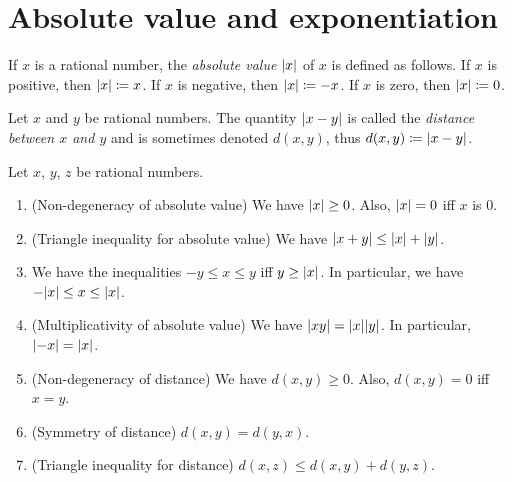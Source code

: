 \section{Absolute value and exponentiation}\label{sec:4.3}

\begin{defn}\label{4.3.1}
  If \(x\) is a rational number, the \emph{absolute value} \(\left\lvert x\right\rvert\) of \(x\) is defined as follows.
  If \(x\) is positive, then \(\left\lvert x\right\rvert \coloneqq x\).
  If \(x\) is negative, then \(\left\lvert x\right\rvert \coloneqq -x\).
  If \(x\) is zero, then \(\left\lvert x\right\rvert \coloneqq 0\).
\end{defn}

\begin{defn}[Distance]\label{4.3.2}
  Let \(x\) and \(y\) be rational numbers.
  The quantity \(\left\lvert x - y\right\rvert\) is called the \emph{distance between \(x\) and \(y\)} and is sometimes denoted \(d(x, y)\), thus \(d(x, y) \coloneqq \left\lvert x - y\right\rvert\).
\end{defn}

\begin{prop}\label{4.3.3}
  Let \(x\), \(y\), \(z\) be rational numbers.
  \begin{enumerate}
    \item (Non-degeneracy of absolute value)
          We have \(\left\lvert x\right\rvert \geq 0\).
          Also, \(\left\lvert x\right\rvert = 0\) iff \(x\) is \(0\).
    \item (Triangle inequality for absolute value)
          We have \(\left\lvert x + y\right\rvert \leq \left\lvert x\right\rvert + \left\lvert y\right\rvert\).
    \item We have the inequalities \(-y \leq x \leq y\) iff \(y \geq \left\lvert x\right\rvert\).
          In particular, we have \(-\abs{x} \leq x \leq \abs{x}\).
    \item (Multiplicativity of absolute value)
          We have \(\abs{xy} = \abs{x} \abs{y}\).
          In particular, \(\left\lvert-x\right\rvert = \left\lvert x\right\rvert\).
    \item (Non-degeneracy of distance)
          We have \(d(x, y) \geq 0\).
          Also, \(d(x, y) = 0\) iff \(x = y\).
    \item (Symmetry of distance)
          \(d(x, y) = d(y, x)\).
    \item (Triangle inequality for distance)
          \(d(x, z) \leq d(x, y) + d(y, z)\).
  \end{enumerate}
\end{prop}

